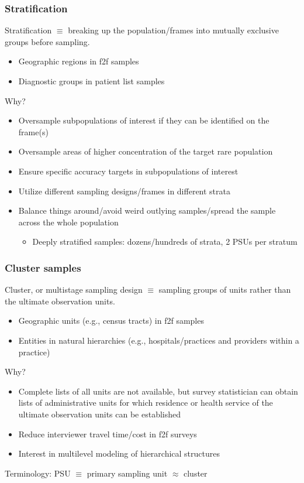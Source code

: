 \documentclass{beamer}
\begin{document}
\begin{frame}\frametitle{Stratification}

Stratification $\equiv$ breaking up the population/frames into mutually exclusive groups before sampling.
\begin{itemize}
    \item Geographic regions in f2f samples
    \item Diagnostic groups in patient list samples
\end{itemize}

Why?

\begin{itemize}
    \item Oversample subpopulations of interest if they can be identified on the frame(s)
    \item Oversample areas of higher concentration of the target rare population
    \item Ensure specific accuracy targets in subpopulations of interest
    \item Utilize different sampling designs/frames in different strata
    \item Balance things around/avoid weird outlying samples/spread the sample across the whole population
    \begin{itemize} \item Deeply stratified samples: dozens/hundreds of strata, 2 PSUs per stratum \end{itemize}
\end{itemize}



\end{frame}

\begin{frame}\frametitle{Cluster samples}

Cluster, or multistage sampling design $\equiv$ sampling groups of units rather than the ultimate observation units.
\begin{itemize}
    \item Geographic units (e.g., census tracts) in f2f samples
    \item Entities in natural hierarchies (e.g., hospitals/practices and providers within a practice)
\end{itemize}

Why?

\begin{itemize}
    \item Complete lists of all units are not available, but survey statistician
        can obtain lists of administrative units
        for which residence or health service of the ultimate observation units
        can be established
    \item Reduce interviewer travel time/cost in f2f surveys
    \item Interest in multilevel modeling of hierarchical structures
\end{itemize}

Terminology: PSU $\equiv$ primary sampling unit $\approx$ cluster

\end{frame}
\end{document}
